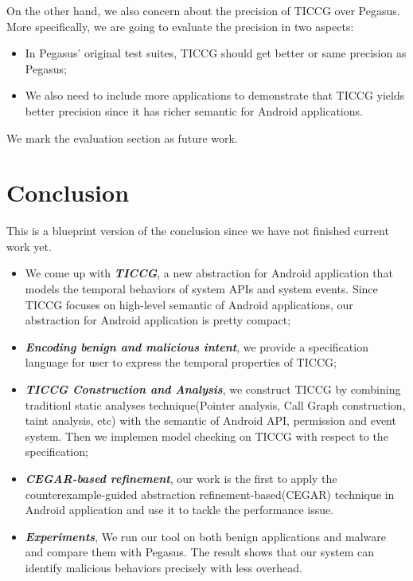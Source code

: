 \documentclass{article}
\begin{document}
On the other hand, we also concern about the precision of TICCG over Pegasus. More 
specifically, we are going to evaluate the precision in two aspects:  
\begin{itemize}
\item In Pegasus' original test suites, TICCG should get better or same precision as 
Pegasus;

\item We also need to include more applications to demonstrate that TICCG yields 
better precision since it has richer semantic for Android applications.
\end{itemize}

We mark the evaluation section as future work.


\section{Conclusion}
\label{sec:conclude}
This is a blueprint version of the conclusion since we have not finished current work yet.

\begin{itemize}
\item We come up with {\bf \emph{TICCG}}, a new abstraction for Android application
that models the temporal behaviors of system APIs and system events. Since TICCG focuses
on high-level semantic of Android applications, our abstraction for Android application
is pretty compact;
\item {\bf \emph{Encoding benign and malicious intent}}, we provide a specification
language for user to express the temporal properties of TICCG; 
\item {\bf \emph{TICCG Construction and Analysis}}, we construct TICCG by combining 
traditionl static analyses technique(Pointer analysis, Call Graph construction, taint analysis, etc)
with the semantic of Android API, permission and event system. Then we implemen
model checking on TICCG with respect to the specification;
\item {\bf \emph{CEGAR-based refinement}}, our work is the first to apply the counterexample-guided abstraction refinement-based(CEGAR) technique in Android application 
and use it to tackle the performance issue. 
\item {\bf \emph{Experiments}}, We run our tool on both benign applications and 
malware and compare them with Pegasus. The result shows that our system can identify malicious behaviors precisely with less overhead.
\end{itemize}


%
%


 
\end{document}
